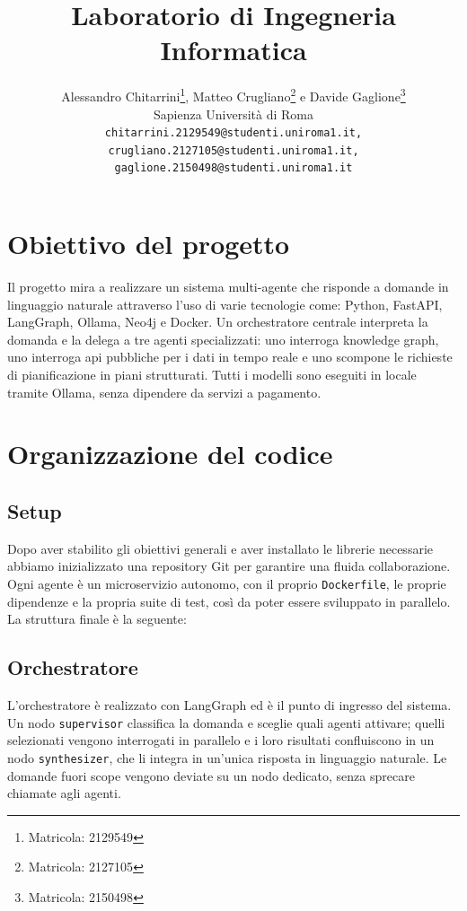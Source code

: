 \documentclass[11pt]{article}
\title{Laboratorio di Ingegneria Informatica}
\author{Alessandro Chitarrini\thanks{Matricola: 2129549}, Matteo Crugliano\thanks{Matricola: 2127105} \textnormal{e} Davide Gaglione\thanks{Matricola: 2150498}\\
  Sapienza Università di Roma \\
  \texttt{chitarrini.2129549@studenti.uniroma1.it,}\\
  \texttt{crugliano.2127105@studenti.uniroma1.it, gaglione.2150498@studenti.uniroma1.it}
}
\begin{document}
\maketitle
\section{Obiettivo del progetto}
Il progetto mira a realizzare un sistema multi-agente che risponde a domande in linguaggio naturale attraverso l'uso di varie tecnologie come: Python, FastAPI, LangGraph, Ollama, Neo4j e Docker. Un orchestratore centrale interpreta la domanda e la delega a tre agenti specializzati: uno interroga knowledge graph, uno interroga api pubbliche per i dati in tempo reale e uno scompone le richieste di pianificazione in piani strutturati. Tutti i modelli sono eseguiti in locale tramite Ollama, senza dipendere da servizi a pagamento.

\section{Organizzazione del codice}
\subsection{Setup}

Dopo aver stabilito gli obiettivi generali e aver installato le librerie necessarie abbiamo inizializzato una repository Git per garantire una fluida collaborazione. Ogni agente è un microservizio autonomo, con il proprio \texttt{Dockerfile}, le proprie dipendenze e la propria suite di test, così da poter essere sviluppato in parallelo. La struttura finale è la seguente:
\smallskip
{}

\subsection{Orchestratore}

L'orchestratore è realizzato con LangGraph ed è il punto di ingresso del sistema. Un nodo \texttt{supervisor} classifica la domanda e sceglie quali agenti attivare; quelli selezionati vengono interrogati in parallelo e i loro risultati confluiscono in un nodo \texttt{synthesizer}, che li integra in un'unica risposta in linguaggio naturale. Le domande fuori scope vengono deviate su un nodo dedicato, senza sprecare chiamate agli agenti.
\end{document}
